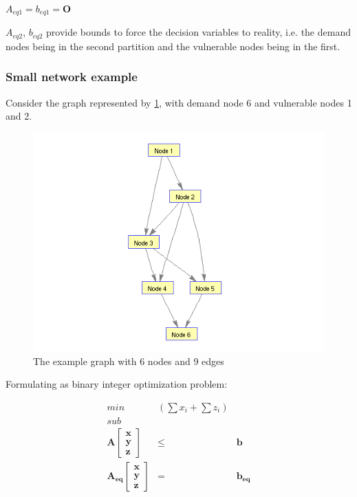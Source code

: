 \documentclass[authoryear,preprint,review,12pt]{elsarticle}
\begin{document}
$A_{eq1}=b_{eq1}=\mathbf{O}$


$A_{eq2}$, $b_{eq2}$ provide bounds to force the decision variables
to reality, i.e. the demand nodes being in the second partition and
the vulnerable nodes being in the first.


\subsubsection{Small network example}

Consider the graph represented by \ref{fig:small_network}, with demand node 6 and
vulnerable nodes 1 and 2.

\begin{figure}[ht]
\includegraphics[scale=0.75]{images/testGraph}\caption{The example graph with 6 nodes and 9 edges}
    \label{fig:small_network}
\end{figure} %


Formulating as binary integer optimization problem:

\begin{eqnarray*}
min & (\sum x_{i}+\sum z_{i})\\
sub\\
\mathbf{A}\left[\begin{array}{c}
\mathbf{x}\\
\mathbf{y}\\
\mathbf{z}
\end{array}\right] & \leq & \mathbf{b}\\
\mathbf{A_{eq}}\left[\begin{array}{c}
\mathbf{x}\\
\mathbf{y}\\
\mathbf{z}
\end{array}\right] & = & \mathbf{b_{eq}}
\end{eqnarray*}
\end{document}
